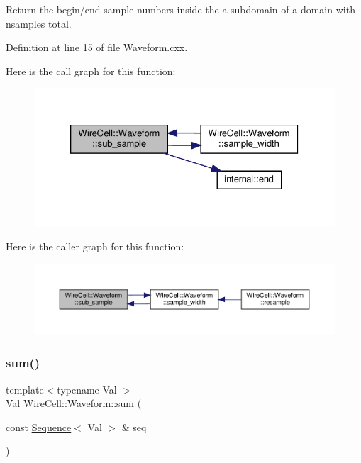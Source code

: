 Return the begin/end sample numbers inside the a subdomain of a domain with nsamples total. 



Definition at line 15 of file Waveform.\+cxx.

Here is the call graph for this function\+:
\nopagebreak
\begin{figure}[H]
\begin{center}
\leavevmode
\includegraphics[width=326pt]{namespace_wire_cell_1_1_waveform_a841c4668962007ef512b7a7df6ecfece_cgraph}
\end{center}
\end{figure}
Here is the caller graph for this function\+:
\nopagebreak
\begin{figure}[H]
\begin{center}
\leavevmode
\includegraphics[width=350pt]{namespace_wire_cell_1_1_waveform_a841c4668962007ef512b7a7df6ecfece_icgraph}
\end{center}
\end{figure}
\mbox{\label{namespace_wire_cell_1_1_waveform_a4c7b82a4567d6c94227398f9511ffb92}} 
\subsubsection{\texorpdfstring{sum()}{sum()}}
{\footnotesize\ttfamily template$<$typename Val $>$ \\
Val Wire\+Cell\+::\+Waveform\+::sum (\begin{DoxyParamCaption}\item[{const \hyperlink{namespace_wire_cell_1_1_waveform_a1d2a1b672e3b220dcd64a994531de95d}{Sequence}$<$ Val $>$ \&}]{seq }\end{DoxyParamCaption})}



